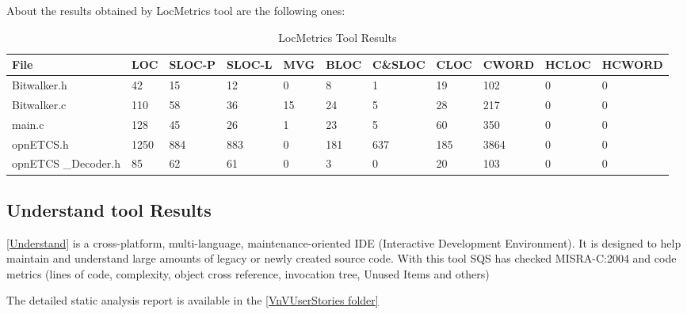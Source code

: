 About the results obtained by LocMetrics tool are the following ones:

\begin{longtable}{||p{}|p{}|p{}|p{}|p{}|p{}|p{}|p{}|p{}|p{}|p{}||}
  \caption{LocMetrics Tool Results}\\
    \hline\hline
    \textbf{File} & LOC &  SLOC-P & SLOC-L & MVG & BLOC & C\&SLOC & CLOC & CWORD & HCLOC & HCWORD \\
    \hline\hline
    \endhead
    \hline\hline
    \endfoot
    Bitwalker.h &
    42 & 15 & 12 & 0 & 8 & 1 & 19 & 102 & 0 & 0
    \\
    \hline
    Bitwalker.c &
    110 & 58 & 36 & 15 & 24 & 5 & 28 & 217 & 0 & 0
    \\
    \hline
    main.c &
    128 & 45 & 26 & 1 & 23 & 5 & 60 & 350 & 0 & 0
    \\
    \hline
    opnETCS.h &
    1250 & 884 & 883 & 0 & 181 & 637 & 185 & 3864 & 0 & 0
    \\
    \hline
    opnETCS
    \_Decoder.h &
    85 & 62 & 61 & 0 & 3 & 0 & 20 & 103 & 0 & 0
    \\
    \hline
\end{longtable}

\subsection{Understand tool Results}
\href{http://www.scitools.com/}{[Understand]} is a cross-platform, multi-language, maintenance-oriented IDE (Interactive Development Environment). It is designed to help maintain and understand large amounts of legacy or newly created source code. With this tool SQS has checked MISRA-C:2004 and code metrics (lines of code, complexity, object cross reference, invocation tree, Unused Items and others)

The detailed static analysis report is available in the \href{https://github.com/openETCS/validation/tree/master/VnVUserStories/VnVUserStorySQS/04-Results}{[VnVUserStories folder]}

